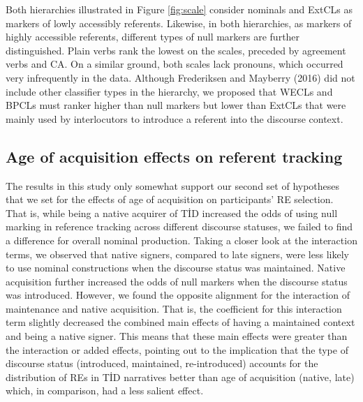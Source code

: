 \documentclass[]{elsarticle} %
\begin{document}
Both hierarchies illustrated in Figure \ref{fig:scale} consider nominals
and ExtCLs as markers of lowly accessibly referents. Likewise, in both
hierarchies, as markers of highly accessible referents, different types
of null markers are further distinguished. Plain verbs rank the lowest
on the scales, preceded by agreement verbs and CA. On a similar ground,
both scales lack pronouns, which occurred very infrequently in the data.
Although Frederiksen and Mayberry (2016) did not include other
classifier types in the hierarchy, we proposed that WECLs and BPCLs must
ranker higher than null markers but lower than ExtCLs that were mainly
used by interlocutors to introduce a referent into the discourse
context.

\hypertarget{age-of-acquisition-effects-on-referent-tracking}{%
\subsection{Age of acquisition effects on referent
tracking}\label{age-of-acquisition-effects-on-referent-tracking}}

The results in this study only somewhat support our second set of
hypotheses that we set for the effects of age of acquisition on
participants' RE selection. That is, while being a native acquirer of
TİD increased the odds of using null marking in reference tracking
across different discourse statuses, we failed to find a difference for
overall nominal production. Taking a closer look at the interaction
terms, we observed that native signers, compared to late signers, were
less likely to use nominal constructions when the discourse status was
maintained. Native acquisition further increased the odds of null
markers when the discourse status was introduced. However, we found the
opposite alignment for the interaction of maintenance and native
acquisition. That is, the coefficient for this interaction term slightly
decreased the combined main effects of having a maintained context and
being a native signer. This means that these main effects were greater
than the interaction or added effects, pointing out to the implication
that the type of discourse status (introduced, maintained,
re-introduced) accounts for the distribution of REs in TİD narratives
better than age of acquisition (native, late) which, in comparison, had
a less salient effect.
\end{document}
